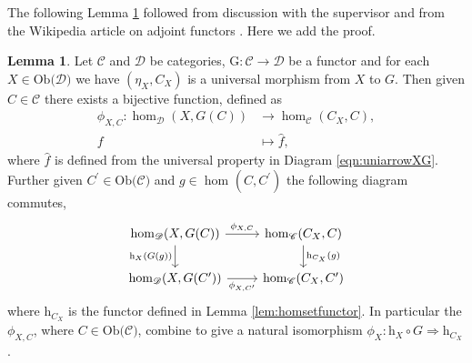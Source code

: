 \documentclass[11pt,a4paper]{article}
\theoremstyle{definition}
\newtheorem{lemma}[thm]{Lemma}
\newcommand\ho[3][]{\hom_{#1}(#2,#3)}
\newcommand\ob[1]{\mathrm{Ob(}#1\mathrm{)}}
\newcommand\cat[1]{\mathscr{#1}}
\newcommand\func[3]{\mathrm{#1}\colon#2\rightarrow#3}
\newcommand\nattran[3]{#1\colon#2\Rightarrow#3}
\numberwithin{equation}{section}
\begin{document}
The following Lemma \ref{lem:hombijection} followed from discussion with the supervisor and from the Wikipedia article on adjoint functors \cite{wiki:adjoint}. Here we add the proof.
\begin{lemma}
    \label{lem:hombijection}
    Let $\cat{C}$ and $\cat{D}$ be categories, $\func{G}{\cat{C}}{\cat{D}}$ be a functor and for each $X\in\ob{\cat{D}}$ we have $(\eta_{X},C_{X})$ is a universal morphism from $X$ to $G$. Then given $C\in\cat{C}$ there exists a bijective function, defined as
    \begin{align*}
        \phi_{X,C}\colon\ho[\cat{D}]{X}{G(C)}&\to\ho[\cat{C}]{C_{X}}{C},\\
        f&\mapsto \hat{f},
    \end{align*}
    where $\hat{f}$ is defined from the universal property in Diagram \eqref{eqn:uniarrowXG}.
    Further given $C^\prime\in\ob{\cat{C}}$ and $g\in\ho{C}{C^\prime}$ the following diagram commutes,
    \begin{equation}
    \label{cd:homisomorph}
    \begin{tikzcd}
    \ho[\cat{D}]{X}{G(C)} \arrow[r, "\phi_{X,C}"] \arrow[d, "\mathrm{h}_{X}(G(g))"'] & \ho[\cat{C}]{C_{X}}{C} \arrow[d, "\mathrm{h}_{C_{X}}(g)"] \\
    \ho[\cat{D}]{X}{G(C^\prime)} \arrow[r, "\phi_{X,C^\prime}"'] & \ho[\cat{C}]{C_{X}}{C^{\prime}} 
    \end{tikzcd}\\
    \end{equation}
    where $\mathrm{h}_{C_X}$ is the functor defined in Lemma \ref{lem:homsetfunctor}. 
    In particular the $\phi_{X,C}$, where $C\in \ob{\cat{C}}$, combine to give a natural isomorphism  $\nattran{\phi_{X}}{\mathrm{h}_{X}\circ G}{\mathrm{h}_{C_{X}}}$.
\end{lemma}
\end{document}

